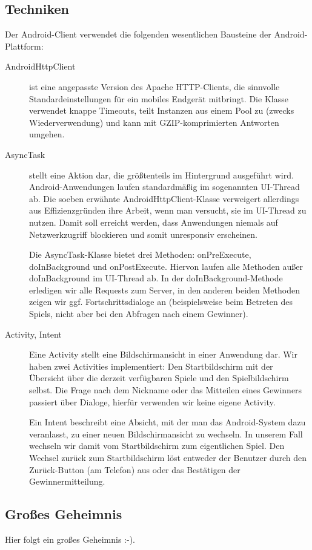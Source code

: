 \documentclass[12pt, a4paper]{scrartcl}
\begin{document}
\subsection{Techniken}

Der Android-Client verwendet die folgenden wesentlichen Bausteine der
Android-Plattform:

\begin{description}
	\item[AndroidHttpClient] ist eine angepasste Version des Apache
	HTTP-Clients, die sinnvolle Standardeinstellungen für ein mobiles
	Endgerät mitbringt. Die Klasse verwendet knappe Timeouts, teilt
	Instanzen aus einem Pool zu (zwecks Wie\-der\-ver\-wen\-dung) und kann mit
	GZIP-komprimierten Antworten umgehen.

	\item[AsyncTask] stellt eine Aktion dar, die größtenteils im
	Hintergrund ausgeführt wird. Android-Anwendungen laufen standardmäßig
	im sogenannten UI-Thread ab. Die soeben erwähnte
	AndroidHttpClient-Klasse verweigert allerdings aus Effizienzgründen
	ihre Arbeit, wenn man versucht, sie im UI-Thread zu nutzen. Damit soll
	erreicht werden, dass Anwendungen niemals auf Netzwerkzugriff
	blockieren und somit unresponsiv erscheinen.

	Die AsyncTask-Klasse bietet drei Methoden: onPreExecute, doInBackground
	und onPostExecute. Hiervon laufen alle Methoden außer doInBackground im
	UI-Thread ab. In der doInBackground-Methode erledigen wir alle Requests
	zum Server, in den anderen beiden Methoden zeigen wir ggf.
	Fortschrittsdialoge an (beispielsweise beim Betreten des Spiels, nicht
	aber bei den Abfragen nach einem Gewinner).

	\item[Activity, Intent] Eine Activity stellt eine Bildschirmansicht in
	einer Anwendung dar. Wir haben zwei Activities implementiert: Den
	Startbildschirm mit der Übersicht über die derzeit verfügbaren Spiele
	und den Spielbildschirm selbst. Die Frage nach dem Nickname oder das
	Mitteilen eines Gewinners passiert über Dialoge, hierfür verwenden wir
	keine eigene Activity.

	Ein Intent beschreibt eine Absicht, mit der man das Android-System dazu
	veranlasst, zu einer neuen Bildschirmansicht zu wechseln. In unserem
	Fall wechseln wir damit vom Startbildschirm zum eigentlichen Spiel. Den
	Wechsel zurück zum Startbildschirm löst entweder der Benutzer durch den
	Zurück-Button (am Telefon) aus oder das Bestätigen der
	Gewinnermitteilung.
\end{description}

\subsection{Großes Geheimnis}

Hier folgt ein großes Geheimnis :-).
\end{document}
